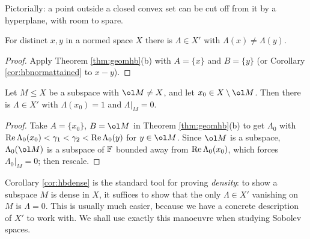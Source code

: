 \documentclass[a4paper]{scrartcl}
\begin{document}
Pictorially: a point outside a closed convex set can be cut off from it by a hyperplane, with room to spare.

\begin{center}
\end{center}

\begin{corollary}\label{cor:hbsep}
	For distinct $x,y$ in a normed space $X$ there is $\Lambda \in X'$ with $\Lambda(x) \ne \Lambda(y)$.
\end{corollary}

\begin{proof}
	Apply Theorem \ref{thm:geomhb}(b) with $A = \{x\}$ and $B = \{y\}$ (or Corollary \ref{cor:hbnormattained} to $x - y$).
\end{proof}

\begin{corollary}\label{cor:hbdense}
	Let $M \le X$ be a subspace with $\ol M \ne X$, and let $x_0 \in X \setminus \ol M$. Then there is $\Lambda \in X'$ with $\Lambda(x_0) = 1$ and $\Lambda|_M = 0$.
\end{corollary}

\begin{proof}
	Take $A = \{x_0\}$, $B = \ol M$ in Theorem \ref{thm:geomhb}(b) to get $\Lambda_0$ with $\operatorname{Re} \Lambda_0(x_0) < \gamma_1 < \gamma_2 < \operatorname{Re}\Lambda_0(y)$ for $y \in \ol M$. Since $\ol M$ is a subspace, $\Lambda_0(\ol M)$ is a subspace of $\mathbb{F}$ bounded away from $\operatorname{Re}\Lambda_0(x_0)$, which forces $\Lambda_0|_M = 0$; then rescale.
\end{proof}

\begin{remark}
	Corollary \ref{cor:hbdense} is the standard tool for proving \emph{density}: to show a subspace $M$ is dense in $X$, it suffices to show that the only $\Lambda \in X'$ vanishing on $M$ is $\Lambda = 0$. This is usually much easier, because we have a concrete description of $X'$ to work with. We shall use exactly this manoeuvre when studying Sobolev spaces.
\end{remark}
\end{document}
